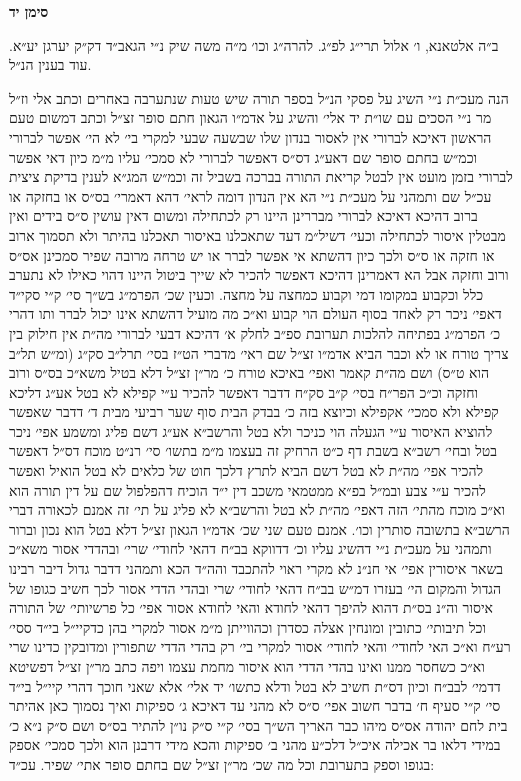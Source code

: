 \documentclass[12pt, openany]{book}
\newcommand{\chapname}{}
\newcommand{\newchap}[1]{
	\addcontentsline{toc}{chapter}{#1}
	\renewcommand{\chapname}{#1}
		\begin{center}
			\textbf{%
\fontsize{16pt}{16pt}\selectfont
				#1}
		\end{center}
}
\begin{document}
\newchap{סימן יד}
\begin{multicols}{2}
ב״ה אלטאנא, ו׳ אלול תרי״ג לפ״ג. להרה״ג וכו׳ מ״ה משה שיק נ״י הגאב״ד דק״ק יערגן יע״א. עוד בענין הנ״ל.\\\vspace{0pt}

הנה מעכ״ת נ״י השיג על פסקי הנ״ל בספר תורה שיש טעות שנתערבה באחרים וכתב אלי וז״ל מר נ״י הסכים עם שו״ת יד אלי׳ והשיג על אדמ״ו הגאון חתם סופר זצ״ל וכתב דמשום טעם הראשון דאיכא לברורי אין לאסור בנדון שלו שבשעה שבעי למקרי בי׳ לא הי׳ אפשר לברורי וכמ״ש בחתם סופר שם דאע״ג דס״ס דאפשר לברורי לא סמכי׳ עליו מ״מ כיון דאי אפשר לברורי בזמן מועט אין לבטל קריאת התורה בברכה בשביל זה וכמ״ש המג״א לענין בדיקת ציצית עכ״ל שם ותמהני על מעכ״ת נ״י הא אין הנדון דומה לראי׳ דהא דאמרי׳ בס״ס או בחזקה או ברוב דהיכא דאיכא לברורי מבררינן היינו רק לכתחילה ומשום דאין עושין ס״ס בידים ואין מבטלין איסור לכתחילה וכעי׳ דשיל״מ דעד שתאכלנו באיסור תאכלנו בהיתר ולא תסמוך ארוב או חזקה או ס״ס ולכך כיון דהשתא אי אפשר לברר או יש טרחה מרובה שפיר סמכינן אס״ס ורוב וחזקה אבל הא דאמרינן דהיכא דאפשר להכיר לא שייך ביטול היינו דהוי כאילו לא נתערב כלל וכקבוע במקומו דמי וקבוע כמחצה על מחצה. וכעין שכ׳ הפרמ״ג בש״ך סי׳ ק״י סקי״ד דאפי׳ ניכר רק לאחד בסוף העולם הוי קבוע וא״כ מה מועיל דהשתא אינו יכול לברר ותו דהרי כ׳ הפרמ״ג בפתיחה להלכות תערובת ספ״ב לחלק א׳ דהיכא דבעי לברורי מה״ת אין חילוק בין צריך טורח או לא וכבר הביא אדמ״ו זצ״ל שם ראי׳ מדברי הט״ז בסי׳ תרל״ב סק״ג (ומ״ש תל״ב הוא ט״ס) ושם מה״ת קאמר ואפי׳ באיכא טורח כ׳ מר״ן זצ״ל דלא בטיל משא״כ בס״ס ורוב וחזקה וכ״כ הפר״ח בסי׳ ק״ב סק״ח דדבר דאפשר להכיר ע״י קפילא לא בטל אע״ג דליכא קפילא ולא סמכי׳ אקפילא וכיוצא בזה כ׳ בבדק הבית סוף שער רביעי מבית ד׳ דדבר שאפשר להוציא האיסור ע״י הגעלה הוי כניכר ולא בטל והרשב״א אע״ג דשם פליג ומשמע אפי׳ ניכר בטל ובחי׳ רשב״א בשבת דף כ״ט הרחיק זה בעצמו מ״מ בתשו׳ סי׳ רנ״ט מוכח דס״ל דאפשר להכיר אפי׳ מה״ת לא בטל דשם הביא לתרץ דלכך חוט של כלאים לא בטל הואיל ואפשר להכיר ע״י צבע ובמ״ל בפ״א ממטמאי משכב דין י״ד הוכיח דהפלפול שם על דין תורה הוא וא״כ מוכח מהתי׳ הזה דאפי׳ מה״ת לא בטל והרשב״א לא פליג על תי׳ זה אמנם לכאורה דברי הרשב״א בתשובה סותרין וכו׳. אמנם טעם שני שכ׳ אדמ״ו הגאון זצ״ל דלא בטל הוא נכון וברור ותמהני על מעכ״ת נ״י דהשיג עליו וכ׳ דדווקא בב״ח דהאי לחודי׳ שרי׳ ובהדדי אסור משא״כ בשאר איסורין אפי׳ אי חנ״נ לא מקרי ראוי להתכבד והה״ד הכא ותמהני דדבר גדול דיבר רבינו הגדול והמקום הי׳ בעזרו דמ״ש בב״ח דהאי לחודי׳ שרי ובהדי הדדי אסור לכך חשיב כגופו של איסור וה״נ בס״ת דהוא להיפך דהאי לחודא והאי לחודא אסור אפי׳ כל פרשיותי׳ של התורה וכל תיבותי׳ כתובין ומונחין אצלה כסדרן וכהווייתן מ״מ אסור למקרי בהן כדקיי״ל בי״ד ססי׳ רע״ח וא״כ האי לחודי׳ והאי לחודי׳ אסור למקרי בי׳ רק בהדי הדדי שתפורין ומדובקין כדינו שרי וא״כ כשחסר ממנו ואינו בהדי הדדי הוא איסור מחמת עצמו ויפה כתב מר״ן זצ״ל דפשיטא דדמי׳ לבב״ח וכיון דס״ת חשיב לא בטל ודלא כתשו׳ יד אלי׳ אלא שאני חוכך דהרי קיי״ל בי״ד סי׳ ק״י סעיף ח׳ בדבר חשוב אפי׳ ס״ס לא מהני עד דאיכא ג׳ ספיקות ואיך נסמוך כאן אהיתר בית לחם יהודה אס״ס מיהו כבר האריך הש״ך בסי׳ ק״י ס״ק נו״ן להתיר בס״ס ושם ס״ק נ״א כ׳ במידי דלאו בר אכילה איכ״ל דלכ״ע מהני ב׳ ספיקות והכא מידי דרבנן הוא ולכך סמכי׳ אספק בגופו וספק בתערובת וכל מה שכ׳ מר״ן זצ״ל שם בחתם סופר אתי׳ שפיר. עכ״ד:\\\vspace{0pt}


\end{multicols}
\end{document}
